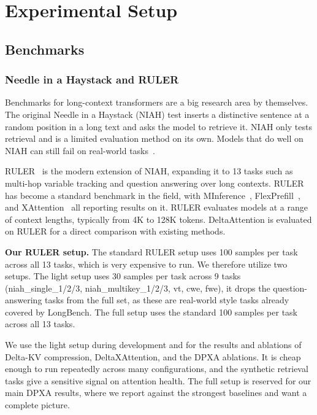 \section{Experimental Setup}

\subsection{Benchmarks}

\subsubsection{Needle in a Haystack and RULER}

Benchmarks for long-context transformers are a big research area by themselves. The original Needle in a Haystack (NIAH) test inserts a distinctive sentence at a random position in a long text and asks the model to retrieve it. NIAH only tests retrieval and is a limited evaluation method on its own. Models that do well on NIAH can still fail on real-world tasks~\cite{kuratov2024babilong}.

RULER~\cite{hsieh2024ruler} is the modern extension of NIAH, expanding it to 13 tasks such as multi-hop variable tracking and question answering over long contexts. RULER has become a standard benchmark in the field, with MInference~\cite{jiang2024minference}, FlexPrefill~\cite{lai2025flexprefill}, and XAttention~\cite{xu2025xattention} all reporting results on it. RULER evaluates models at a range of context lengths, typically from 4K to 128K tokens. DeltaAttention is evaluated on RULER for a direct comparison with existing methods.

\textbf{Our RULER setup.} The standard RULER setup uses 100 samples per task across all 13 tasks, which is very expensive to run. We therefore utilize two setups. The light setup uses 30 samples per task across 9 tasks (niah\_single\_1/2/3, niah\_multikey\_1/2/3, vt, cwe, fwe), it drops the question-answering tasks from the full set, as these are real-world style tasks already covered by LongBench. The full setup uses the standard 100 samples per task across all 13 tasks.

We use the light setup during development and for the results and ablations of Delta-KV compression, DeltaXAttention, and the DPXA ablations. It is cheap enough to run repeatedly across many configurations, and the synthetic retrieval tasks give a sensitive signal on attention health. The full setup is reserved for our main DPXA results, where we report against the strongest baselines and want a complete picture.

